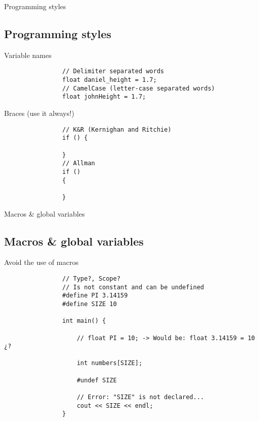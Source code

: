 \documentclass{beamer}
\newcommand{\normalSizeItem}[1] {
  \normalsize{\item #1}
}
\newcommand{\smallCite}[1]{
	\begin{small}
		\cite{#1}	
	\end{small}
}
\begin{document}
		\begin{frame}[fragile]{Programming styles}	
			\subsection{Programming styles}
			\begin{itemize}
			
				\normalSizeItem{Variable names \smallCite{namingConvention}}
				\begin{lstlisting}
				// Delimiter separated words
				float daniel_height = 1.7;
				// CamelCase (letter-case separated words)
				float johnHeight = 1.7;
				\end{lstlisting}
				
				\normalSizeItem{Braces (use it always!) \smallCite{indentationStyle}}
				\begin{lstlisting}
				// K&R (Kernighan and Ritchie)
				if () {
				
				}
				// Allman
				if ()
				{
				
				}
				\end{lstlisting}
				
			\end{itemize}
		\end{frame}
		
		\begin{frame}[fragile]{Macros \& global variables}	
			\subsection{Macros \& global variables}
			\begin{itemize}
			
				\normalSizeItem{Avoid the use of macros}
				\begin{lstlisting}
				// Type?, Scope?
				// Is not constant and can be undefined
				#define PI 3.14159
				#define SIZE 10
				
				int main() {
					
					// float PI = 10; -> Would be: float 3.14159 = 10 ¿?
					
					int numbers[SIZE];
					
					#undef SIZE
					
					// Error: "SIZE" is not declared...
					cout << SIZE << endl;
				}
				\end{lstlisting}
				
			\end{itemize}
		\end{frame}
		
\end{document}
